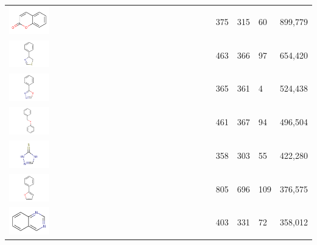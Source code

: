 \begin{longtable}
\begin{tabular}{ p{}p{}p{}p{}p{} }
\includegraphics[align=c,width=0.2\textwidth]{data/badapple/scaf_07.png} & 375 & 315 & 60 & 899,779 \\
\includegraphics[align=c,width=0.2\textwidth]{data/badapple/scaf_08.png} & 463 & 366 & 97 & 654,420 \\
\includegraphics[align=c,width=0.2\textwidth]{data/badapple/scaf_09.png} & 365 & 361 & 4 & 524,438 \\
\includegraphics[align=c,width=0.2\textwidth]{data/badapple/scaf_10.png} & 461 & 367 & 94 & 496,504 \\
\includegraphics[align=c,width=0.2\textwidth]{data/badapple/scaf_11.png} & 358 & 303 & 55 & 422,280 \\
\includegraphics[align=c,width=0.2\textwidth]{data/badapple/scaf_12.png} & 805 & 696 & 109 & 376,575 \\
\includegraphics[align=c,width=0.2\textwidth]{data/badapple/scaf_13.png} & 403 & 331 & 72 & 358,012 \\

\end{tabular}
\end{longtable}
